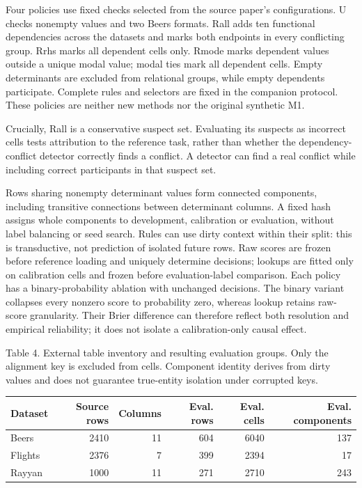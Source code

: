 Four policies use fixed checks selected from the source paper's
configurations. U checks nonempty values and two Beers formats. Rall
adds ten functional dependencies across the datasets and marks both
endpoints in every conflicting group. Rrhs marks all dependent cells
only. Rmode marks dependent values outside a unique modal value; modal
ties mark all dependent cells. Empty determinants are excluded from
relational groups, while empty dependents participate. Complete rules
and selectors are fixed in the companion protocol. These policies are
neither new methods nor the original synthetic M1.

Crucially, Rall is a conservative suspect set. Evaluating its suspects
as incorrect cells tests attribution to the reference task, rather than
whether the dependency-conflict detector correctly finds a conflict. A
detector can find a real conflict while including correct participants
in that suspect set.

Rows sharing nonempty determinant values form connected components,
including transitive connections between determinant columns. A fixed
hash assigns whole components to development, calibration or evaluation,
without label balancing or seed search. Rules can use dirty context
within their split: this is transductive, not prediction of isolated
future rows. Raw scores are frozen before reference loading and uniquely
determine decisions; lookups are fitted only on calibration cells and
frozen before evaluation-label comparison. Each policy has a
binary-probability ablation with unchanged decisions. The binary variant
collapses every nonzero score to probability zero, whereas lookup
retains raw-score granularity. Their Brier difference can therefore
reflect both resolution and empirical reliability; it does not isolate a
calibration-only causal effect.

\noindent\begin{minipage}{\linewidth}
\noindent Table 4. External table inventory and resulting evaluation groups. Only
the alignment key is excluded from cells. Component identity derives
from dirty values and does not guarantee true-entity isolation under
corrupted keys.
\par\medskip\centering
\begin{tabular}{@{}lrrrrr@{}}
\toprule
Dataset & Source rows & Columns & Eval. rows & Eval. cells & Eval.
components \\
\midrule

Beers & 2410 & 11 & 604 & 6040 & 137 \\
Flights & 2376 & 7 & 399 & 2394 & 17 \\
Rayyan & 1000 & 11 & 271 & 2710 & 243 \\
\bottomrule
\end{tabular}
\end{minipage}


